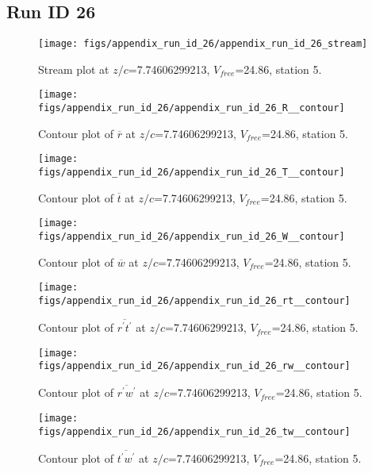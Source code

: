 \subsection{Run ID 26}
\begin{figure}[H]
\centering
\texttt{[image: figs/appendix\_run\_id\_26/appendix\_run\_id\_26\_stream]}
\caption{Stream plot at $z/c$=7.74606299213, $V_{free}$=24.86, station 5.}
\label{fig:appendix_run_id_26_stream}
\end{figure}


\begin{figure}[H]
\centering
\texttt{[image: figs/appendix\_run\_id\_26/appendix\_run\_id\_26\_R\_\_contour]}
\caption{Contour plot of $\overline{r}$ at $z/c$=7.74606299213, $V_{free}$=24.86, station 5.}
\label{fig:appendix_run_id_26_R__contour}
\end{figure}


\begin{figure}[H]
\centering
\texttt{[image: figs/appendix\_run\_id\_26/appendix\_run\_id\_26\_T\_\_contour]}
\caption{Contour plot of $\overline{t}$ at $z/c$=7.74606299213, $V_{free}$=24.86, station 5.}
\label{fig:appendix_run_id_26_T__contour}
\end{figure}


\begin{figure}[H]
\centering
\texttt{[image: figs/appendix\_run\_id\_26/appendix\_run\_id\_26\_W\_\_contour]}
\caption{Contour plot of $\overline{w}$ at $z/c$=7.74606299213, $V_{free}$=24.86, station 5.}
\label{fig:appendix_run_id_26_W__contour}
\end{figure}


\begin{figure}[H]
\centering
\texttt{[image: figs/appendix\_run\_id\_26/appendix\_run\_id\_26\_rt\_\_contour]}
\caption{Contour plot of $\overline{r^\prime t^\prime}$ at $z/c$=7.74606299213, $V_{free}$=24.86, station 5.}
\label{fig:appendix_run_id_26_rt__contour}
\end{figure}


\begin{figure}[H]
\centering
\texttt{[image: figs/appendix\_run\_id\_26/appendix\_run\_id\_26\_rw\_\_contour]}
\caption{Contour plot of $\overline{r^\prime w^\prime}$ at $z/c$=7.74606299213, $V_{free}$=24.86, station 5.}
\label{fig:appendix_run_id_26_rw__contour}
\end{figure}


\begin{figure}[H]
\centering
\texttt{[image: figs/appendix\_run\_id\_26/appendix\_run\_id\_26\_tw\_\_contour]}
\caption{Contour plot of $\overline{t^\prime w^\prime}$ at $z/c$=7.74606299213, $V_{free}$=24.86, station 5.}
\label{fig:appendix_run_id_26_tw__contour}
\end{figure}


